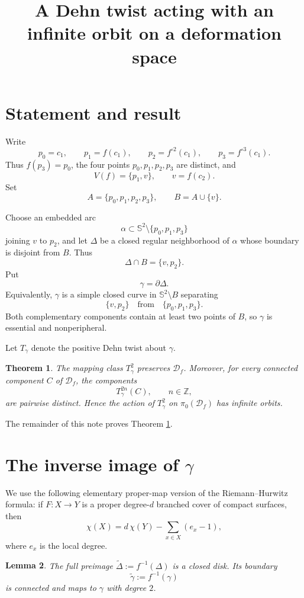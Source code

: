 \documentclass[11pt]{article}
\title{A Dehn twist acting with an infinite orbit on a deformation space}
\author{}
\date{}
\newcommand{\Sph}{\mathbb S^2}
\newcommand{\D}{\mathcal D}
\newtheorem{theorem}{Theorem}[section]
\newtheorem{lemma}[theorem]{Lemma}
\theoremstyle{remark}
\begin{document}
\maketitle

\section{Statement and result}

Write
\[
p_0=c_1,\qquad p_1=f(c_1),\qquad p_2=f^{\circ 2}(c_1),\qquad
p_3=f^{\circ 3}(c_1).
\]
Thus \(f(p_3)=p_0\), the four points \(p_0,p_1,p_2,p_3\) are
distinct, and
\[
V(f)=\{p_1,v\},\qquad v=f(c_2).
\]
Set
\[
A=\{p_0,p_1,p_2,p_3\},
\qquad
B=A\cup\{v\}.
\]

Choose an embedded arc
\[
\alpha\subset \Sph\setminus\{p_0,p_1,p_3\}
\]
joining \(v\) to \(p_2\), and let \(\Delta\) be a closed regular
neighborhood of \(\alpha\) whose boundary is disjoint from \(B\).
Thus
\[
\Delta\cap B=\{v,p_2\}.
\]
Put
\[
\gamma=\partial\Delta.
\]
Equivalently, \(\gamma\) is a simple closed curve in
\(\Sph\setminus B\) separating
\[
\{v,p_2\}
\quad\text{from}\quad
\{p_0,p_1,p_3\}.
\]
Both complementary components contain at least two points of \(B\), so
\(\gamma\) is essential and nonperipheral.

Let \(T_\gamma\) denote the positive Dehn twist about \(\gamma\).

\begin{theorem}\label{thm:main}
The mapping class \(T_\gamma^2\) preserves \(\D_f\).  Moreover,
for every connected component \(C\) of \(\D_f\), the components
\[
T_\gamma^{2n}(C),\qquad n\in\mathbb Z,
\]
are pairwise distinct.  Hence the action of \(T_\gamma^2\) on
\(\pi_0(\D_f)\) has infinite orbits.
\end{theorem}

The remainder of this note proves Theorem \ref{thm:main}.

\section{The inverse image of \(\gamma\)}

We use the following elementary proper-map version of the
Riemann--Hurwitz formula: if \(F:X\to Y\) is a proper degree-\(d\)
branched cover of compact surfaces, then
\[
\chi(X)=d\,\chi(Y)-\sum_{x\in X}(e_x-1),
\]
where \(e_x\) is the local degree.

\begin{lemma}\label{lem:preimage-disk}
The full preimage \(\widetilde\Delta:=f^{-1}(\Delta)\) is a closed
disk.  Its boundary
\[
\widetilde\gamma:=f^{-1}(\gamma)
\]
is connected and maps to \(\gamma\) with degree \(2\).
\end{lemma}
\end{document}
